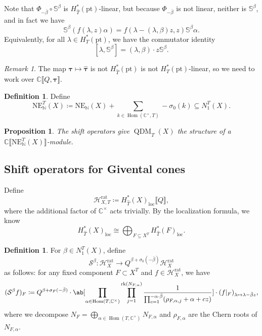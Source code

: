 \documentclass{amsart}
\newtheorem{prop}[thm]{Proposition}
\theoremstyle{definition}
\newtheorem{defn}[thm]{Definition}
\theoremstyle{remark}
\newtheorem{rmk}[thm]{Remark}
\theoremstyle{plain}
\theoremstyle{definition}
\theoremstyle{remark}
\newcommand{\N}{\mathbb{N}}
\newcommand{\C}{\mathbb{C}}
\newcommand{\bS}{\mathbb{S}}
\renewcommand{\mc}[1]{\mathcal{#1}}
\newcommand{\btau}{\symbf{\tau}}
\newcommand{\mr}[1]{\mathrm{#1}}
\newcommand{\on}[1]{\operatorname{#1}}
\newcommand{\1}{\mathbf{1}}
\newcommand{\2}{\mathbf{2}}
\newcommand{\3}{\mathbf{3}}
\newcommand{\ps}[1]{\lBrack #1 \rBrack}
\DeclareMathOperator{\Hom}{Hom}
\DeclareMathOperator{\QDM}{QDM}
\begin{document}
Note that \(\Phi_{-\bar{\beta}} \circ \bS^{\beta}\) is \(H_{\hat{T}}^*(\mr{pt})\)-linear, but because \(\Phi_{-\bar{\beta}}\) is not linear, neither is \(\bS^{\beta}\), and in fact we have
\[ \bS^{\beta}(f(\lambda, z)\alpha) = f(\lambda - (\lambda, \beta)z, z) \bS^{\beta} \alpha. \]
Equivalently, for all \(\lambda \in H_T^*(\mr{pt})\), we have the commutator identity
\[ [\lambda, \bS^{\beta}] = (\lambda, \beta) \cdot z \bS^{\beta}. \]

\begin{rmk}
    The map \(\btau \mapsto \hat{\btau}\) is not \(H_{\hat{T}}^*(\mr{pt})\) is not \(H_T^*(\mr{pt})\)-linear, so we need to work over \(\C \ps{Q, \btau}\).
\end{rmk}

\begin{defn}
    Define
    \[ \mr{NE}_{\N}^T(X) \coloneqq \mr{NE}_{\N}(X) + \sum_{k \in \Hom(\C^{\times}, T)} -\sigma_0(k) \subseteq N_1^T(X). \]
\end{defn}

\begin{prop}
    The shift operators give \(\QDM_T(X)\) the structure of a \(\C\ps{\mr{NE}_{\N}^T(X)}\)-module.
\end{prop}

\subsection{Shift operators for Givental cones}%
\label{sub:Shift operators for Givental cones}

Define
\[ \mc{H}_{X,T}^{\mr{rat}} \coloneqq H_{\hat{T}}^*(X)_{\mr{loc}} \ps{Q}, \]
where the additional factor of \(\C^{\times}\) acts trivially. By the localization formula, we know
\[ H_{\hat{T}}^*(X)_{\mr{loc}} \cong \bigoplus_{F \subseteq X^T} H_{\hat{T}}^*(F)_{\mr{loc}}. \]

\begin{defn}
    For \(\beta \in N_1^T(X)\), define
    \[ \mc{S}^{\beta} \colon \mc{H}_X^{\mr{rat}} \to Q^{\beta + \sigma_0(-\bar{\beta})} \mc{H}_X^{\mr{rat}} \]
    as follows: for any fixed component \(F \subset X^T\) and \(f \in \mc{H}_X^{\mr{rat}}\), we have
    \[ (\mc{S}^{\beta}f)_F \coloneqq Q^{\beta + \sigma_F(-\bar{\beta})} \cdot \ab[\prod_{\alpha \in \Hom(T, \C^{\times})} \prod_{j=1}^{\on{rk}(N_{F,\alpha})} \frac{1}{\prod_{c=1}^{-\alpha \cdot \bar{\beta}}(\rho_{F, \alpha, j} + \alpha + cz)}] \cdot (f|_F)_{\lambda \mapsto \lambda - \bar{\beta} z}, \]
    where we decompose \(N_F = \bigoplus_{\alpha \in \Hom(T, \C^{\times})} N_{F, \alpha}\) and \(\rho_{F, \alpha}\) are the Chern roots of \(N_{F, \alpha}\).
\end{defn}
\end{document}
